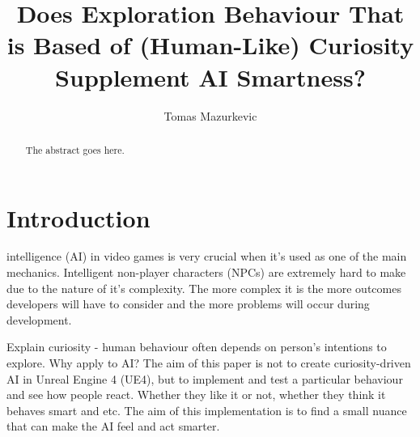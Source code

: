 \documentclass[journal]{IEEEtran}
\begin{document}
%
\title{Does Exploration Behaviour That is Based of (Human-Like) Curiosity Supplement AI Smartness?}
%
%
\author{Tomas Mazurkevic}


\maketitle

\begin{abstract}
The abstract goes here.
\end{abstract}

\section{Introduction}
% 
% 
% 
% 
 intelligence (AI) in video games is very crucial when it's used as one of the main mechanics. Intelligent non-player characters (NPCs) are extremely hard to make due to the nature of it's complexity. The more complex it is the more outcomes developers will have to consider and the more problems will occur during development. 

Explain curiosity - human behaviour often depends on person's intentions to explore. Why apply to AI? The aim of this paper is not to create curiosity-driven AI in Unreal Engine 4 (UE4), but to implement and test a particular behaviour and see how people react. Whether they like it or not, whether they think it behaves smart and etc. The aim of this implementation is to find a small nuance that can make the AI feel and act smarter.
\end{document}
